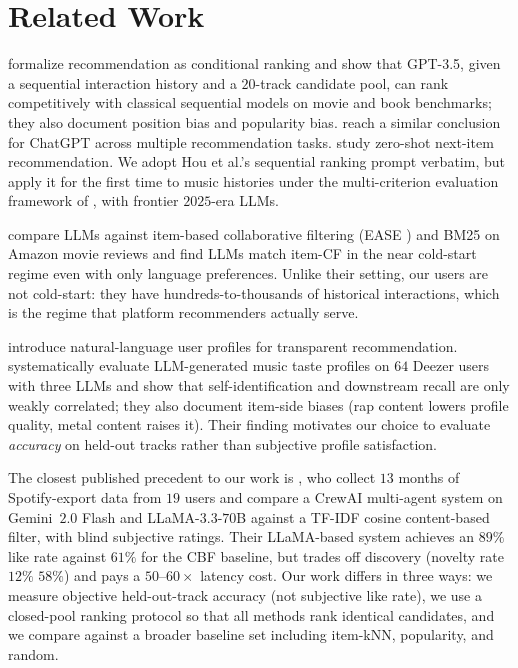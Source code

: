 \section{Related Work}
\label{sec:related}

 \citet{hou2024llm} formalize recommendation as conditional ranking and show that GPT-3.5, given a sequential interaction history and a $20$-track candidate pool, can rank competitively with classical sequential models on movie and book benchmarks; they also document position bias and popularity bias. \citet{dai2023uncovering} reach a similar conclusion for ChatGPT across multiple recommendation tasks. \citet{wang2023zero} study zero-shot next-item recommendation. We adopt Hou et al.'s sequential ranking prompt verbatim, but apply it for the first time to music histories under the multi-criterion evaluation framework of \citet{epure2025music}, with frontier $2025$-era LLMs.

 \citet{sanner2023llms} compare LLMs against item-based collaborative filtering (EASE \citep{steck2019embarrassingly}) and BM25 on Amazon movie reviews and find LLMs match item-CF in the near cold-start regime even with only language preferences. Unlike their setting, our users are not cold-start: they have hundreds-to-thousands of historical interactions, which is the regime that platform recommenders actually serve.

 \citet{radlinski2022natural} introduce natural-language user profiles for transparent recommendation. \citet{sguerra2025biases} systematically evaluate LLM-generated music taste profiles on $64$ Deezer users with three LLMs and show that self-identification and downstream recall are only weakly correlated; they also document item-side biases (rap content lowers profile quality, metal content raises it). Their finding motivates our choice to evaluate \emph{accuracy} on held-out tracks rather than subjective profile satisfaction.

 The closest published precedent to our work is \citet{boadana2025llm}, who collect $13$ months of Spotify-export data from $19$ users and compare a CrewAI multi-agent system on Gemini~$2.0$ Flash and LLaMA-$3.3$-$70$B against a TF-IDF cosine content-based filter, with blind subjective ratings. Their LLaMA-based system achieves an $89\%$ like rate against $61\%$ for the CBF baseline, but trades off discovery (novelty rate $12\%$ \versus $58\%$) and pays a $50$--$60\times$ latency cost. Our work differs in three ways: we measure objective held-out-track accuracy (not subjective like rate), we use a closed-pool ranking protocol so that all methods rank identical candidates, and we compare against a broader baseline set including item-kNN, popularity, and random.

